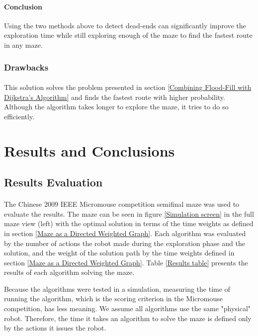\documentclass[12pt]{article}
\begin{document}
\paragraph{Conclusion}
Using the two methods above to detect dead-ends can significantly improve the exploration time while still exploring enough of the \gls{maze} to find the fastest route in any \gls{maze}.

\subsubsection{Drawbacks}
\paragraph{}
This solution solves the problem presented in section \ref{Combining Flood-Fill with Dijkstra's Algorithm} and finds the fastest route with higher probability.
Although the algorithm takes longer to explore the \gls{maze}, it tries to do so efficiently.

\section{Results and Conclusions} \label{results}
\subsection{Results Evaluation}
\paragraph{}
The Chinese 2009 \gls{IEEE} \gls{Micromouse} competition semifinal \gls{maze} was used to evaluate the results.
The \gls{maze} can be seen in figure \ref{Simulation screen} in the full \gls{maze} view (left) with the optimal solution in terms of the time weights as defined in section \ref{Maze as a Directed Weighted Graph}.
Each algorithm was evaluated by the number of actions the robot made during the exploration phase and the solution, and the weight of the solution path by the time weights defined in section \ref{Maze as a Directed Weighted Graph}.
Table \ref{Results table} presents the results of each algorithm solving the \gls{maze}.

Because the algorithms were tested in a simulation, measuring the time of running the algorithm, which is the scoring criterion in the \gls{Micromouse} competition, has less meaning.
We assume all algorithms use the same "physical" robot.
Therefore, the time it takes an algorithm to solve the \gls{maze} is defined only by the actions it issues the robot.
\end{document}
